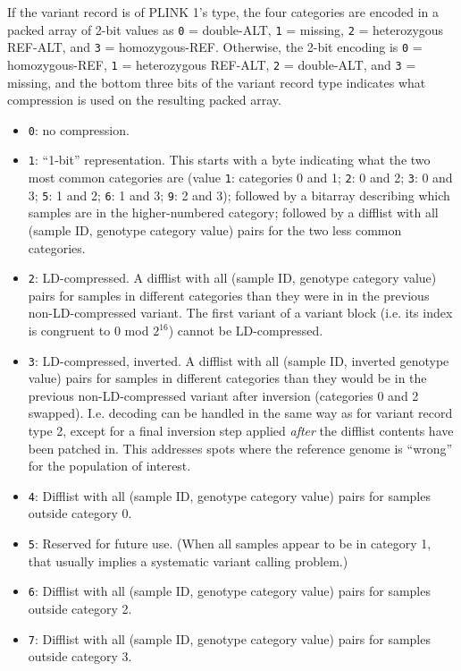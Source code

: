 \documentclass[8pt]{article}
\begin{document}
If the variant record is of PLINK 1's type, the four categories are encoded in
a packed array of 2-bit values as \texttt{0} = double-ALT, \texttt{1} =
missing, \texttt{2} = heterozygous REF-ALT, and \texttt{3} = homozygous-REF.
Otherwise, the 2-bit encoding is \texttt{0} = homozygous-REF, \texttt{1} =
heterozygous REF-ALT, \texttt{2} = double-ALT, and \texttt{3} = missing, and
the bottom three bits of the variant record type indicates what compression is
used on the resulting packed array.

\begin{itemize}
\item \texttt{0}: no compression.
\item \texttt{1}: ``1-bit'' representation.  This starts with a byte indicating
  what the two most common categories are (value \texttt{1}: categories 0 and
  1; \texttt{2}: 0 and 2; \texttt{3}: 0 and 3; \texttt{5}: 1 and 2; \texttt{6}:
  1 and 3; \texttt{9}: 2 and 3); followed by a bitarray describing which
  samples are in the higher-numbered category; followed by a difflist with all
  (sample ID, genotype category value) pairs for the two less common
  categories.
\item \texttt{2}: LD-compressed.  A difflist with all (sample ID, genotype
  category value) pairs for samples in different categories than they were in
  in the previous non-LD-compressed variant.  The first variant of a variant
  block (i.e. its index is congruent to 0 mod $2^{16}$) cannot be
  LD-compressed.
\item \texttt{3}: LD-compressed, inverted.  A difflist with all (sample ID,
  inverted genotype value) pairs for samples in different categories than they
  would be in the previous non-LD-compressed variant after inversion
  (categories 0 and 2 swapped).  I.e. decoding can be handled in the same way
  as for variant record type 2, except for a final inversion step applied
  \textit{after} the difflist contents have been patched in.  This addresses
  spots where the reference genome is ``wrong'' for the population of interest.
\item \texttt{4}: Difflist with all (sample ID, genotype category value) pairs
  for samples outside category 0.
\item \texttt{5}: Reserved for future use.  (When all samples appear to be in
  category 1, that usually implies a systematic variant calling problem.)
\item \texttt{6}: Difflist with all (sample ID, genotype category value) pairs
  for samples outside category 2.
\item \texttt{7}: Difflist with all (sample ID, genotype category value) pairs
  for samples outside category 3.
\end{itemize}
\end{document}
